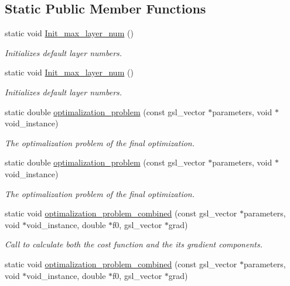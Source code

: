 \subsection*{Static Public Member Functions}
\begin{DoxyCompactItemize}
\item 
static void \hyperlink{class_decomposition___base_a24c7d112a4f3b2346c3d885316f3bfa1}{Init\+\_\+max\+\_\+layer\+\_\+num} ()
\begin{DoxyCompactList}\small\item\em Initializes default layer numbers. \end{DoxyCompactList}\item 
static void \hyperlink{class_decomposition___base_abdb59c6b355a338eb958f58d6f28b966}{Init\+\_\+max\+\_\+layer\+\_\+num} ()
\begin{DoxyCompactList}\small\item\em Initializes default layer numbers. \end{DoxyCompactList}\item 
static double \hyperlink{class_n___qubit___decomposition_ad033ed0d5e3f1795f5c7c8c4952ac6da}{optimalization\+\_\+problem} (const gsl\+\_\+vector $\ast$parameters, void $\ast$void\+\_\+instance)
\begin{DoxyCompactList}\small\item\em The optimalization problem of the final optimization. \end{DoxyCompactList}\item 
static double \hyperlink{class_n___qubit___decomposition_a8494fcf34e2896b9272def3b0fd36f0b}{optimalization\+\_\+problem} (const gsl\+\_\+vector $\ast$parameters, void $\ast$void\+\_\+instance)
\begin{DoxyCompactList}\small\item\em The optimalization problem of the final optimization. \end{DoxyCompactList}\item 
static void \hyperlink{class_n___qubit___decomposition_ac7f9831d2b69be26e34a9862ed85d44b}{optimalization\+\_\+problem\+\_\+combined} (const gsl\+\_\+vector $\ast$parameters, void $\ast$void\+\_\+instance, double $\ast$f0, gsl\+\_\+vector $\ast$grad)
\begin{DoxyCompactList}\small\item\em Call to calculate both the cost function and the its gradient components. \end{DoxyCompactList}\item 
static void \hyperlink{class_n___qubit___decomposition_a164b7438c02f0a6df4f4e202b0dab468}{optimalization\+\_\+problem\+\_\+combined} (const gsl\+\_\+vector $\ast$parameters, void $\ast$void\+\_\+instance, double $\ast$f0, gsl\+\_\+vector $\ast$grad)

\end{DoxyCompactItemize}
